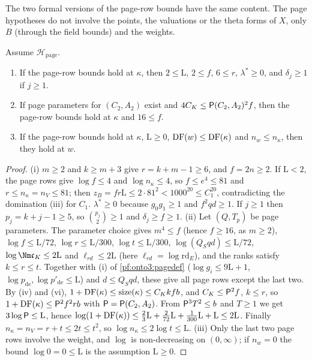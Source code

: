 The two formal versions of the page-row bounds have the same content. The page hypotheses do not involve the points,
the valuations or the theta forms of $X$, only $B$ (through the field bounds) and the weights.

\begin{lemma}\label{pf:onto3:pagerows}
Assume $\mathcal H_{\mathrm{page}}$.
\begin{enumerate}[label=(\roman*)]
\item If the page-row bounds hold at $\kappa$, then $2\le\mathrm L$, $2\le f$, $6\le r$, $\lambda^*\ge0$, and $\delta_j\ge1$
if $j\ge1$.
\item If page parameters for $(C_2,A_2)$ exist and $4C_K\le\mathsf{P}(C_2,A_2)^2f$, then the page-row bounds hold at
$\kappa$ and $16\le f$.
\item If the page-row bounds hold at $\kappa$, $\mathrm L\ge0$, $\operatorname{DF}(w)\le\operatorname{DF}(\kappa)$ and $n_w\le n_\kappa$,
then they hold at $w$.
\end{enumerate}
\end{lemma}

\begin{proof}
(i) $m\ge2$ and $k\ge m+3$ give $r=k+m-1\ge6$, and $f=2n\ge2$. If $\mathrm L<2$, the page rows give $\log f\le4$ and
$\log n_\kappa\le4$, so $f\le e^4\le81$ and $r\le n_\kappa=n_V\le81$; then $z_B=fr\mathrm L\le2\cdot81^2<1000^{20}\le
C_1^{20}$, contradicting the domination (iii) for $C_1$. $\lambda^*\ge0$ because $g_0g_1\ge1$ and $f^2qd\ge1$. If
$j\ge1$ then $p_j=k+j-1\ge5$, so $\binom{p_j}2\ge1$ and $\delta_j\ge f\ge1$.
(ii) Let $(Q,T_p)$ be page parameters. The parameter choice gives $m^4\le f$ (hence $f\ge16$, as $m\ge2$), $\log f\le
\mathrm L/72$, $\log r\le\mathrm L/300$, $\log t\le\mathrm L/300$, $\log(Q_Sqd)\le\mathrm L/72$, $\log\Nm\mathfrak c_K\le2\mathrm L$
and $\ell_{rd}\le2\mathrm L$ (here $\ell_{rd}=\log\mathrm{rd}_E$), and the ranks satisfy $k\le r\le t$. Together with (i) of
\cref{pf:onto3:pagedef} ($\log g_i\le9\mathrm L+1$, $\log p_{\mathrm{de}},\log p'_{\mathrm{de}}\le\mathrm L$) and $d\le Q_Sqd$,
these give all page rows except the last two. By (iv) and (vi), $1+\operatorname{DF}(\kappa)\le\operatorname{size}(\kappa)\le C_Kkfb$,
and $C_K\le\mathsf{P}^2f$, $k\le r$, so $1+\operatorname{DF}(\kappa)\le\mathsf{P}^2f^2rb$ with $\mathsf{P}=\mathsf{P}(C_2,A_2)$.
From $\mathsf{P}^3T^2\le b$ and $T\ge1$ we get $3\log\mathsf{P}\le\mathrm L$, hence $\log(1+\operatorname{DF}(\kappa))\le
\frac23\mathrm L+\frac2{72}\mathrm L+\frac1{300}\mathrm L+\mathrm L\le2\mathrm L$. Finally $n_\kappa=n_V=r+t\le2t\le t^2$, so
$\log n_\kappa\le2\log t\le\mathrm L$.
(iii) Only the last two page rows involve the weight, and $\log$ is non-decreasing on $(0,\infty)$; if $n_w=0$ the
bound $\log0=0\le\mathrm L$ is the assumption $\mathrm L\ge0$.
\end{proof}

